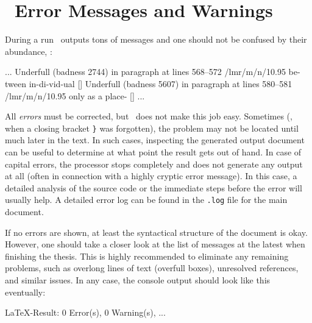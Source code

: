 \section{\latex\ Error Messages and Warnings}

During a run \latex\ outputs tons of messages and one should not be
confused by their abundance, \eg:

\begin{GenericCode}[numbers=none]
...
Underfull \hbox (badness 2744) in paragraph at lines 568--572
/lmr/m/n/10.95 be-tween in-di-vid-ual
[]
Underfull \hbox (badness 5607) in paragraph at lines 580--581
/lmr/m/n/10.95 only as a place-
[]
...
\end{GenericCode}

\noindent
All \emph{errors} must be corrected, but \latex\ does not make this job easy.
Sometimes (\eg, when a closing bracket \verb!}! was forgotten), the problem may
not be located until much later in the text. In such cases, inspecting the
generated output document can be useful to determine at what point the result
gets out of hand. In case of capital errors, the \latex processor stops
completely and does not generate any output at all (often in connection with a highly
cryptic error message). In this case, a detailed analysis of the source code or
the immediate steps before the error will usually help. A detailed error log can be
found in the \verb!.log! file for the main document.

If no errors are shown, at least the syntactical structure of the document is
okay. However, one should take a closer look at the list of messages at the
latest when finishing the thesis. This is highly recommended to eliminate any
remaining problems, such as overlong lines of text (overfull boxes), unresolved
references, and similar issues. In any case, the console output should look like 
this eventually:
%
\begin{GenericCode}[numbers=none]
LaTeX-Result: 0 Error(s), 0 Warning(s), ...
\end{GenericCode}


